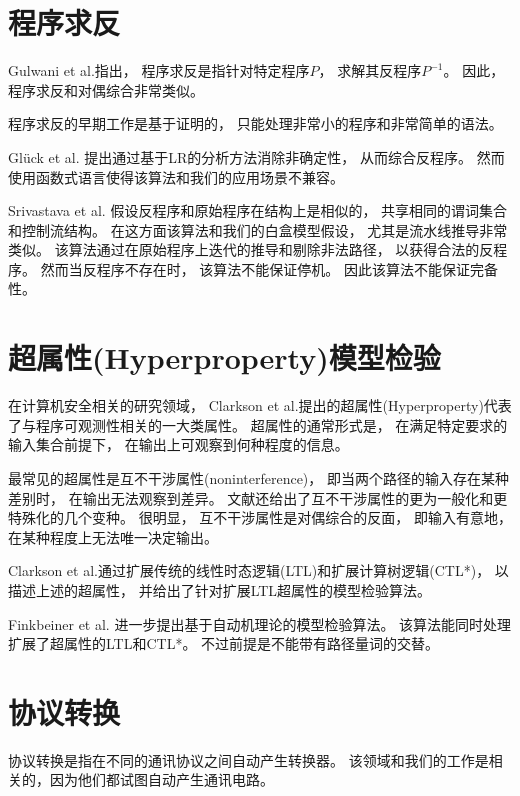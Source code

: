 \section{程序求反}\label{subsec_proinv}
Gulwani et al.指出，
程序求反是指针对特定程序$P$，
求解其反程序$P^{-1}$。
因此，
程序求反和对偶综合非常类似。

程序求反的早期工作是基于证明的，
只能处理非常小的程序和非常简单的语法。

Gl\"{u}ck et al.  提出通过基于LR的分析方法消除非确定性，
从而综合反程序。
然而使用函数式语言使得该算法和我们的应用场景不兼容。

Srivastava et al. 假设反程序和原始程序在结构上是相似的，
共享相同的谓词集合和控制流结构。
在这方面该算法和我们的白盒模型假设，
尤其是流水线推导非常类似。
该算法通过在原始程序上迭代的推导和剔除非法路径，
以获得合法的反程序。
然而当反程序不存在时，
该算法不能保证停机。
因此该算法不能保证完备性。

\section{超属性(Hyperproperty)模型检验}
在计算机安全相关的研究领域，
Clarkson et al.提出的超属性(Hyperproperty)代表了与程序可观测性相关的一大类属性。
超属性的通常形式是，
在满足特定要求的输入集合前提下，
在输出上可观察到何种程度的信息。

最常见的超属性是互不干涉属性(noninterference)，
即当两个路径的输入存在某种差别时，
在输出无法观察到差异。
文献还给出了互不干涉属性的更为一般化和更特殊化的几个变种。
很明显，
互不干涉属性是对偶综合的反面，
即输入有意地，
在某种程度上无法唯一决定输出。

Clarkson et al.通过扩展传统的线性时态逻辑(LTL)和扩展计算树逻辑(CTL*)，
以描述上述的超属性，
并给出了针对扩展LTL超属性的模型检验算法。

Finkbeiner et al. 进一步提出基于自动机理论的模型检验算法。
该算法能同时处理扩展了超属性的LTL和CTL*。
不过前提是不能带有路径量词的交替。


\section{协议转换}
协议转换是指在不同的通讯协议之间自动产生转换器。
该领域和我们的工作是相关的，因为他们都试图自动产生通讯电路。

